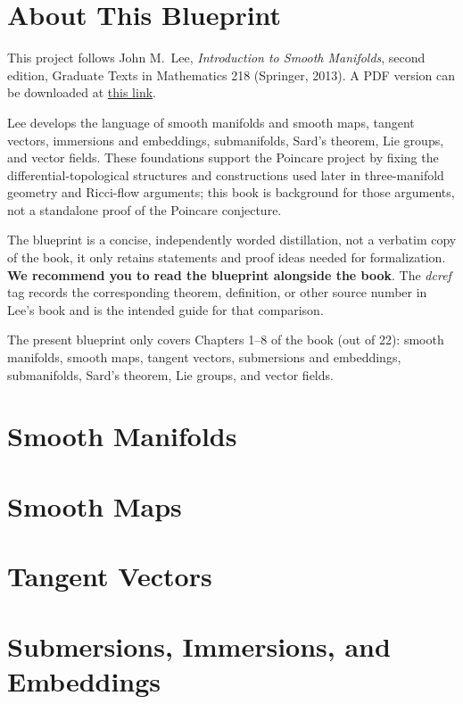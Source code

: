 

\chapter*{About This Blueprint}

This project follows John M.~Lee, \emph{Introduction to Smooth Manifolds},
second edition, Graduate Texts in Mathematics 218 (Springer, 2013). A PDF
version can be downloaded at
\href{https://julianchaidez.net/materials/reu/lee_smooth_manifolds.pdf}{this link}.

Lee develops the language of smooth manifolds and smooth maps, tangent
vectors, immersions and embeddings, submanifolds, Sard's theorem, Lie groups,
and vector fields. These foundations support the Poincare project by fixing
the differential-topological structures and constructions used later in
three-manifold geometry and Ricci-flow arguments; this book is background for
those arguments, not a standalone proof of the Poincare conjecture.

The blueprint is a concise, independently worded distillation, not a verbatim
copy of the book, it only retains statements and proof ideas needed for
formalization. \textbf{We recommend you to read the blueprint alongside the book}. The \emph{dcref} tag records the corresponding theorem,
definition, or other source number in Lee's book and is the intended guide for
that comparison.

The present blueprint only covers Chapters 1--8 of the book (out of 22): smooth manifolds,
smooth maps, tangent vectors, submersions and embeddings, submanifolds, Sard's
theorem, Lie groups, and vector fields.

\chapter{Smooth Manifolds}
\label{chap:smooth-manifolds}


\chapter{Smooth Maps}
\label{chap:smooth-maps}


\chapter{Tangent Vectors}
\label{chap:tangent-vectors}


\chapter{Submersions, Immersions, and Embeddings}
\label{chap:submersions-immersions-embeddings}


